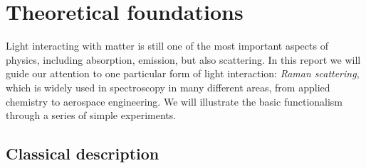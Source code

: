 \section{Theoretical foundations}
Light interacting with matter is still one of the most important aspects of physics, including
absorption, emission, but also scattering. In this report we will guide our attention to one
particular form of light interaction: \textit{Raman scattering}, which is widely used in spectroscopy
in many different areas, from applied chemistry to aerospace engineering. We will illustrate the 
basic functionalism through a series of simple experiments.

\subsection{Classical description}
\label{sub:classical_description}

